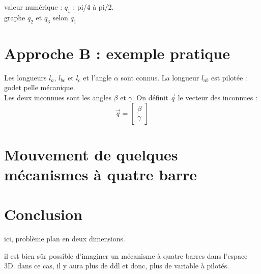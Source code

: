 \documentclass[12pt,a4paper]{article}
\begin{document}
valeur numérique : 
$q_1$ : pi/4 à pi/2. \\

graphe $q_2$ et $q_3$ selon $q_1$
\section{Approche B : exemple pratique}
Les longueurs $l_a$, $l_{bc}$ et $l_{c}$ et l'angle $\alpha$ sont connus. La longueur $l_{ab}$ est pilotée : godet pelle mécanique. \\
Les deux inconnues sont les angles $\beta$ et $\gamma$. On définit $\vec{q}$ le vecteur des inconnues :
\begin{equation}
\vec{q}=\begin{bmatrix}
\beta\\
\gamma
\end{bmatrix}
\end{equation}


\section{Mouvement de quelques mécanismes à quatre barre}



\section{Conclusion}
ici, problème plan en deux dimensions.

il est bien sûr possible d'imaginer un mécanisme à quatre barres dans l'espace 3D. dans ce cas, il y aura plus de ddl et donc, plus de variable à pilotés. 
\end{document}

